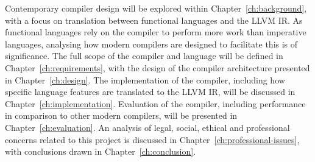 Contemporary compiler design will be explored within Chapter~\ref{ch:background}, with a focus on
translation between functional languages and the LLVM IR. As functional languages rely on the
compiler to perform more work than imperative languages, analysing how modern compilers are designed
to facilitate this is of significance. The full scope of the compiler and language will be defined
in Chapter~\ref{ch:requirements}, with the design of the compiler architecture presented in
Chapter~\ref{ch:design}. The implementation of the compiler, including how specific language
features are translated to the LLVM IR, will be discussed in Chapter~\ref{ch:implementation}.
Evaluation of the compiler, including performance in comparison to other modern compilers, will be
presented in Chapter~\ref{ch:evaluation}. An analysis of legal, social, ethical and professional
concerns related to this project is discussed in Chapter~\ref{ch:professional-issues}, with
conclusions drawn in Chapter~\ref{ch:conclusion}.
